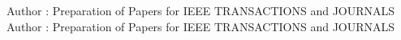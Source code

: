 \documentclass{ieeeaccess}
\begin{document}



\markboth
{Author \headeretal: Preparation of Papers for IEEE TRANSACTIONS and JOURNALS}
{Author \headeretal: Preparation of Papers for IEEE TRANSACTIONS and JOURNALS}

\end{document}

